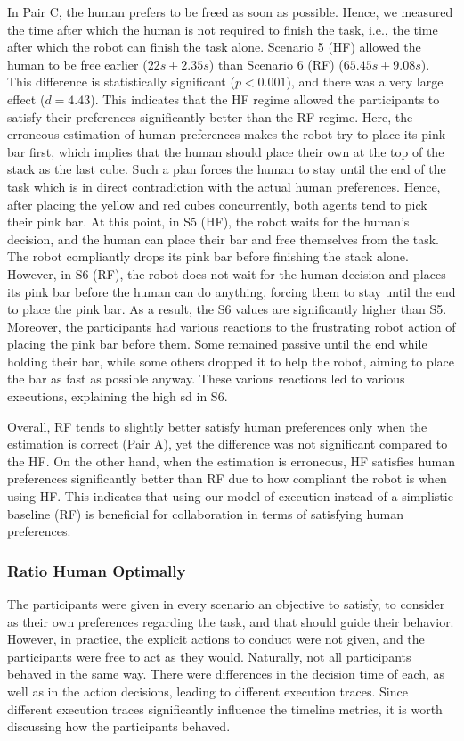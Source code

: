 In Pair C, the human prefers to be freed as soon as possible. Hence, we measured the time after which the human is not required to finish the task, i.e., the time after which the robot can finish the task alone. Scenario 5 (HF) allowed the human to be free earlier ($22s \pm 2.35s$) than Scenario 6 (RF) ($65.45s \pm 9.08s$). This difference is statistically significant ($p < 0.001$), and there was a very large effect ($d = 4.43$). This indicates that the HF regime allowed the participants to satisfy their preferences significantly better than the RF regime. 
Here, the erroneous estimation of human preferences makes the robot try to place its pink bar first, which implies that the human should place their own at the top of the stack as the last cube. Such a plan forces the human to stay until the end of the task which is in direct contradiction with the actual human preferences. Hence, after placing the yellow and red cubes concurrently, both agents tend to pick their pink bar. At this point, in S5 (HF), the robot waits for the human's decision, and the human can place their bar and free themselves from the task. The robot compliantly drops its pink bar before finishing the stack alone. However, in S6 (RF), the robot does not wait for the human decision and places its pink bar before the human can do anything, forcing them to stay until the end to place the pink bar. As a result, the S6 values are significantly higher than S5. Moreover, the participants had various reactions to the frustrating robot action of placing the pink bar before them. Some remained passive until the end while holding their bar, while some others dropped it to help the robot, aiming to place the bar as fast as possible anyway. These various reactions led to various executions, explaining the high \acrshort{sd} in S6.

Overall, RF tends to slightly better satisfy human preferences only when the estimation is correct (Pair A), yet the difference was not significant compared to the HF. On the other hand, when the estimation is erroneous, HF satisfies human preferences significantly better than RF due to how compliant the robot is when using HF. This indicates that using our model of execution instead of a simplistic baseline (RF) is beneficial for collaboration in terms of satisfying human preferences. 

\subsubsection*{Ratio Human Optimally}
The participants were given in every scenario an objective to satisfy, to consider as their own preferences regarding the task, and that should guide their behavior. However, in practice, the explicit actions to conduct were not given, and the participants were free to act as they would. Naturally, not all participants behaved in the same way. There were differences in the decision time of each, as well as in the action decisions, leading to different execution traces.
Since different execution traces significantly influence the timeline metrics, it is worth discussing how the participants behaved.

